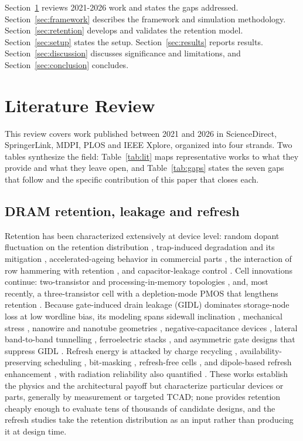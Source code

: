 \documentclass[11pt,a4paper]{article}
\begin{document}
Section~\ref{sec:lit} reviews 2021-2026 work and states the gaps addressed.
Section~\ref{sec:framework} describes the framework and simulation methodology.
Section~\ref{sec:retention} develops and validates the retention model.
Section~\ref{sec:setup} states the setup. Section~\ref{sec:results} reports
results. Section~\ref{sec:discussion} discusses significance and limitations, and
Section~\ref{sec:conclusion} concludes.

\section{Literature Review}
\label{sec:lit}

This review covers work published between 2021 and 2026 in ScienceDirect,
SpringerLink, MDPI, PLOS and IEEE Xplore, organized into four strands. Two
tables synthesize the field: Table~\ref{tab:lit} maps representative works to
what they provide and what they leave open, and Table~\ref{tab:gaps} states the
seven gaps that follow and the specific contribution of this paper that closes
each.

\subsection{DRAM retention, leakage and refresh}

Retention has been characterized extensively at device level: random dopant
fluctuation on the retention distribution \cite{kim2021rdf}, trap-induced
degradation and its mitigation \cite{kim2021trap}, accelerated-ageing behavior in
commercial parts \cite{bepary2022aging}, the interaction of row hammering with
retention \cite{yun2021rowhammer}, and capacitor-leakage control
\cite{park2025capleak}. Cell innovations continue: two-transistor and
processing-in-memory topologies \cite{kong2025twoT,kong2024pim1}, and, most
recently, a three-transistor cell with a depletion-mode PMOS that lengthens
retention \cite{kong2026threeT}. Because gate-induced drain leakage (GIDL)
dominates storage-node loss at low wordline bias, its modeling spans sidewall
inclination \cite{maniyar2022sidewall}, mechanical stress \cite{lee2022stress},
nanowire and nanotube geometries \cite{thakur2023gidl}, negative-capacitance
devices \cite{kaushal2022ncfinfet}, lateral band-to-band tunnelling
\cite{bashir2024btbt}, ferroelectric stacks \cite{kwak2024gidl}, and asymmetric
gate designs that suppress GIDL \cite{nano2026gidl}. Refresh energy is attacked by
charge recycling \cite{du2025crdram}, availability-preserving scheduling
\cite{golman2021refresh,tcad2026refresh}, bit-masking \cite{nguyen2021zem},
refresh-free cells \cite{gupta2021tfet}, and dipole-based refresh enhancement
\cite{ted2026refresh}, with radiation reliability also quantified
\cite{luza2022neutron}. These works establish the physics and the architectural
payoff but characterize particular devices or parts, generally by measurement or
targeted TCAD; none provides retention cheaply enough to evaluate tens of
thousands of candidate designs, and the refresh studies take the retention
distribution as an input rather than producing it at design time.
\end{document}
